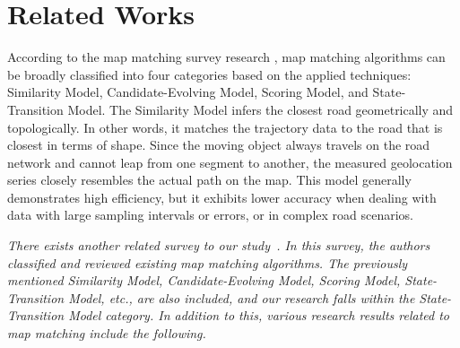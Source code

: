 \documentclass[preprint,12pt]{elsarticle}
\begin{document}
\section{Related Works}
\label{sec:sec2}
According to the map matching survey research \cite{chao2020survey}, map matching algorithms can be broadly classified into four categories based on the applied techniques: Similarity Model, Candidate-Evolving Model, Scoring Model, and State-Transition Model.
The Similarity Model infers the closest road geometrically and topologically. In other words, it matches the trajectory data to the road that is closest in terms of shape. Since the moving object always travels on the road network and cannot leap from one segment to another, the measured geolocation series closely resembles the actual path on the map. This model generally demonstrates high efficiency, but it exhibits lower accuracy when dealing with data with large sampling intervals or errors, or in complex road scenarios.

\emph{There exists another related survey to our study~\cite{jiang2022driving}. In this survey, the authors classified and reviewed existing map matching algorithms. The previously mentioned Similarity Model, Candidate-Evolving Model, Scoring Model, State-Transition Model, etc., are also included, and our research falls within the State-Transition Model category. In addition to this, various research results related to map matching include the following.}
\end{document}
